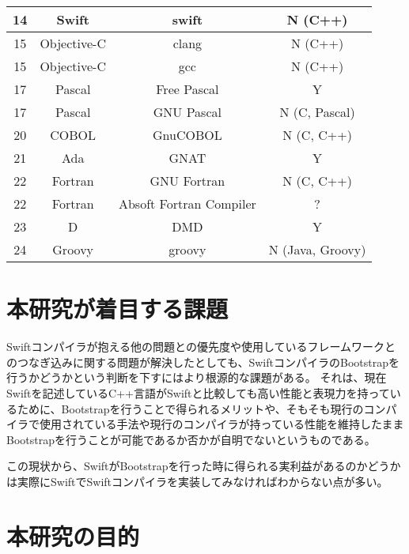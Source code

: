 \begin{table}[hb]
\begin{center}
\begin{tabular}{|c|c|c|c|}
            \hline
            14 & Swift & swift & N (C++) \\
            \hline
            15 & Objective-C & clang & N (C++) \\
            \hline
            15 & Objective-C & gcc & N (C++) \\
            \hline
            17 & Pascal & Free Pascal & Y \\
            \hline
            17 & Pascal & GNU Pascal & N (C, Pascal) \\
            \hline
            20 & COBOL & GnuCOBOL & N (C, C++) \\
            \hline
            21 & Ada & GNAT & Y \\
            \hline
            22 & Fortran & GNU Fortran & N (C, C++) \\
            \hline
            22 & Fortran & Absoft Fortran Compiler & ? \\
            \hline
            23 & D & DMD & Y \\
            \hline
            24 & Groovy & groovy & N (Java, Groovy) \\
            \hline
        \end{tabular}
        \label{table:bootstrapping-languages}
    \end{center}
\end{table}


\section{本研究が着目する課題}
\label{introduction:issue}

Swiftコンパイラが抱える他の問題との優先度や使用しているフレームワークとのつなぎ込みに関する問題が解決したとしても、SwiftコンパイラのBootstrapを行うかどうかという判断を下すにはより根源的な課題がある。
それは、現在Swiftを記述しているC++言語がSwiftと比較しても高い性能と表現力を持っているために、Bootstrapを行うことで得られるメリットや、そもそも現行のコンパイラで使用されている手法や現行のコンパイラが持っている性能を維持したままBootstrapを行うことが可能であるか否かが自明でないというものである。

この現状から、SwiftがBootstrapを行った時に得られる実利益があるのかどうかは実際にSwiftでSwiftコンパイラを実装してみなければわからない点が多い。

\section{本研究の目的}
\label{introduction:purpose}

